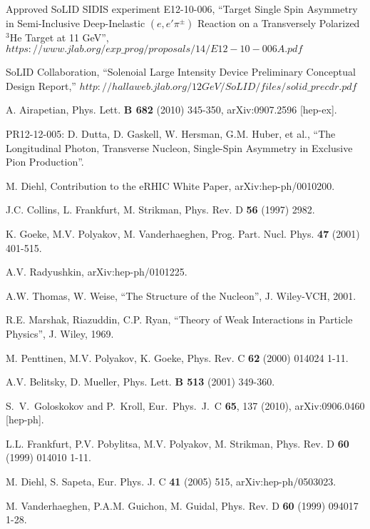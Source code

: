 \clearpage
\begin{thebibliography}{}

  Approved SoLID SIDIS experiment E12-10-006,
  ``Target Single Spin Asymmetry in Semi-Inclusive Deep-Inelastic
  $(e,e'\pi^{\pm})$ Reaction on a Transversely Polarized $\mathrm{^{3}He}$
  Target at 11 GeV'',
$https://www.jlab.org/exp\_prog/proposals/14/E12-10-006A.pdf$

  SoLID Collaboration, ``Solenoial Large Intensity Device Preliminary
  Conceptual Design Report,''
  $http://hallaweb.jlab.org/12GeV/SoLID/files/solid\_precdr.pdf$
  
 A. Airapetian, Phys. Lett. {\bf B 682} (2010) 345-350,
  arXiv:0907.2596 [hep-ex].

 PR12-12-005:
D. Dutta, D. Gaskell, W. Hersman, G.M. Huber, et al., ``The Longitudinal
Photon, Transverse Nucleon, Single-Spin Asymmetry in Exclusive Pion
Production''.

 M. Diehl, Contribution to the eRHIC White Paper,
arXiv:hep-ph/0010200.

 J.C. Collins, L. Frankfurt, M. Strikman, Phys. Rev. D {\bf 56}
  (1997) 2982.

 K. Goeke, M.V. Polyakov, M. Vanderhaeghen,
  Prog. Part. Nucl. Phys. {\bf 47} (2001) 401-515.

 A.V. Radyushkin, arXiv:hep-ph/0101225.

 A.W. Thomas, W. Weise, ``The Structure of the Nucleon'',
  J. Wiley-VCH, 2001.

 R.E. Marshak, Riazuddin, C.P. Ryan, ``Theory of Weak
  Interactions in Particle Physics'', J. Wiley, 1969.

 M. Penttinen, M.V. Polyakov, K. Goeke, Phys. Rev. C {\bf 62}
  (2000) 014024 1-11.

 A.V. Belitsky, D. Mueller, Phys. Lett. {\bf B 513}
  (2001) 349-360.

 S.~V.~Goloskokov and P.~Kroll, Eur.\ Phys.\ J.\ C {\bf 65},
  137 (2010), arXiv:0906.0460 [hep-ph].

 L.L. Frankfurt, P.V. Pobylitsa, M.V. Polyakov, M. Strikman,
  Phys. Rev. D {\bf 60} (1999) 014010 1-11.

 M. Diehl, S. Sapeta, Eur. Phys. J. C {\bf 41} (2005) 515,
  arXiv:hep-ph/0503023.

 M. Vanderhaeghen, P.A.M. Guichon, M. Guidal, Phys. Rev. D 
  {\bf 60} (1999) 094017 1-28.


\end{thebibliography}
